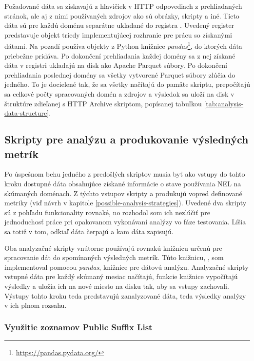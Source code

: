 Požadované dáta sa získavajú z hlavičiek v HTTP odpovediach z prehliadaných stránok, ale aj z nimi používaných zdrojov ako sú obrázky, skripty a iné.
Tieto dáta sú pre každú doménu separátne ukladané do registra .
Uvedený register predstavuje objekt triedy implementujúcej rozhranie pre prácu so získanými dátami. 
Na pozadí používa  objekty z Python knižnice \textit{pandas}\footnote{\url{https://pandas.pydata.org/}}, do ktorých dáta priebežne pridáva.
Po dokončení prehliadania každej domény sa z nej získané dáta v registri ukladajú na disk ako Apache Parquet súbory.
Po dokončení prehliadania poslednej domény sa všetky vytvorené Parquet súbory zlúčia do jedného.
To je docielené tak, že sa všetky načítajú do pamäte skriptu, prepočítajú sa celkové počty spracovaných domén a zdrojov a výsledok sa uloží na disk v štruktúre zdieľanej s HTTP Archive skriptom, popísanej tabuľkou \ref{tab:analysis-data-structure}.

\subsection{Skripty pre analýzu a produkovanie výsledných metrík}
\label{analyze_results}

Po úspešnom behu jedného z predošlých skriptov musia byť ako vstupy do tohto kroku dostupné dáta obsahujúce získané informácie o stave používania NEL na skúmaných doménach.
Z týchto vstupov skripty  a  produkujú vopred definované metriky (viď návrh v kapitole \ref{possible-analysis-strategies}).
Uvedené dva skripty sú z pohľadu funkcionality rovnaké, no rozhodol som ich nezlúčiť pre jednoduchosť práce pri opakovanom vykonávaní analýzy vo fáze testovania.
Líšia sa totiž v tom, odkiaľ dáta čerpajú a kam dáta zapisujú.

Oba analyzačné skripty vnútorne používajú rovnakú knižnicu určenú pre spracovanie dát do spomínaných výsledných metrík.
Túto knižnicu, , som implementoval pomocou \textit{pandas}, knižnice pre dátovú analýzu.
Analyzačné skripty vstupné dáta pre každý skúmaný mesiac načítajú, funkcie knižnice vypočítajú výsledky a uložia ich na nové miesto na disku tak, aby sa vstupy zachovali.
Výstupy tohto kroku teda predstavujú zanalyzované dáta, teda výsledky analýzy v ich plnom rozsahu.

\subsubsection{Využitie zoznamov Public Suffix List}

